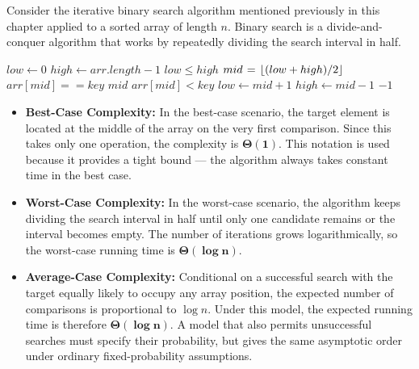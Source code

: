 \begin{example}


Consider the iterative binary search algorithm mentioned previously in this chapter applied to a sorted array of length $n$. Binary search is a divide-and-conquer algorithm that works by repeatedly dividing the search interval in half.

\begin{codebox}
    \li $low \gets 0$ 
    \li $high \gets arr.length -1$ 
    \li \While $low \leq high$ \Do
    \li     $mid \mathrel{\hspace{1pt}=\hspace{1pt}} \left\lfloor (low + high) / 2 \right\rfloor$ 
    \li     \If $arr[mid] == key$ \Then
    \li         \Return $mid$ 
    \li     \ElseIf $arr[mid] < key$ \Then
    \li         $low \gets mid + 1$ 
    \li     \Else
    \li         $high \gets mid - 1$ 
        \End
        \End
    \li \Return $-1$ 
\end{codebox}

\begin{itemize}
    \item \textbf{Best-Case Complexity: } 
    In the best-case scenario, the target element is located at the middle of the array on the very first comparison. Since this takes only one operation, the complexity is $\boldsymbol{\Theta(1)}$. This notation is used because it provides a tight bound — the algorithm always takes constant time in the best case.

    \item \textbf{Worst-Case Complexity: }
    In the worst-case scenario, the algorithm keeps dividing the search interval in half until only one candidate remains or the interval becomes empty. The number of iterations grows logarithmically, so the worst-case running time is $\boldsymbol{\Theta(\log n)}$.

    \item \textbf{Average-Case Complexity: }  
    Conditional on a successful search with the target equally likely to occupy any array position, the expected number of comparisons is proportional to $\log n$. Under this model, the expected running time is therefore $\boldsymbol{\Theta(\log n)}$. A model that also permits unsuccessful searches must specify their probability, but gives the same asymptotic order under ordinary fixed-probability assumptions.
\end{itemize}
\end{example}

